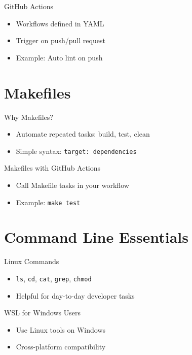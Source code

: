\documentclass[aspectratio=169]{beamer} %
\begin{document}
\begin{frame}{GitHub Actions}
  \begin{itemize}
    \item Workflows defined in YAML
    \item Trigger on push/pull request
    \item Example: Auto lint on push
  \end{itemize}
\end{frame}

\section{Makefiles}

\begin{frame}{Why Makefiles?}
  \begin{itemize}
    \item Automate repeated tasks: build, test, clean
    \item Simple syntax: \texttt{target: dependencies}
  \end{itemize}
\end{frame}

\begin{frame}{Makefiles with GitHub Actions}
  \begin{itemize}
    \item Call Makefile tasks in your workflow
    \item Example: \texttt{make test}
  \end{itemize}
\end{frame}

\section{Command Line Essentials}

\begin{frame}{Linux Commands}
  \begin{itemize}
    \item \texttt{ls}, \texttt{cd}, \texttt{cat}, \texttt{grep}, \texttt{chmod}
    \item Helpful for day-to-day developer tasks
  \end{itemize}
\end{frame}

\begin{frame}{WSL for Windows Users}
  \begin{itemize}
    \item Use Linux tools on Windows
    \item Cross-platform compatibility
  \end{itemize}
\end{frame}
\end{document}
